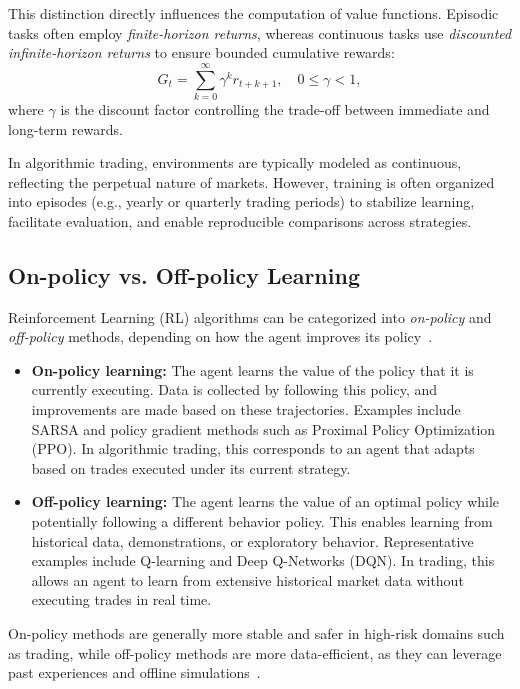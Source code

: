 \documentclass[12pt,a4paper]{report}
\begin{document}
This distinction directly influences the computation of value functions. Episodic tasks often employ \textit{finite-horizon returns}, whereas continuous tasks use \textit{discounted infinite-horizon returns} to ensure bounded cumulative rewards:
\[
G_t = \sum_{k=0}^{\infty} \gamma^k r_{t+k+1}, \quad 0 \leq \gamma < 1,
\]
where $\gamma$ is the discount factor controlling the trade-off between immediate and long-term rewards.

In algorithmic trading, environments are typically modeled as continuous, reflecting the perpetual nature of markets. However, training is often organized into episodes (e.g., yearly or quarterly trading periods) to stabilize learning, facilitate evaluation, and enable reproducible comparisons across strategies.

\subsection{On-policy vs. Off-policy Learning}

Reinforcement Learning (RL) algorithms can be categorized into \textit{on-policy} and \textit{off-policy} methods, depending on how the agent improves its policy~\cite{sutton2018reinforcement}.

\begin{itemize}
    \item \textbf{On-policy learning:} The agent learns the value of the policy that it is currently executing. Data is collected by following this policy, and improvements are made based on these trajectories. Examples include SARSA and policy gradient methods such as Proximal Policy Optimization (PPO). In algorithmic trading, this corresponds to an agent that adapts based on trades executed under its current strategy.
    
    \item \textbf{Off-policy learning:} The agent learns the value of an optimal policy while potentially following a different behavior policy. This enables learning from historical data, demonstrations, or exploratory behavior. Representative examples include Q-learning and Deep Q-Networks (DQN). In trading, this allows an agent to learn from extensive historical market data without executing trades in real time.
\end{itemize}

On-policy methods are generally more stable and safer in high-risk domains such as trading, while off-policy methods are more data-efficient, as they can leverage past experiences and offline simulations~\cite{sutton2018reinforcement}.  
\end{document}
